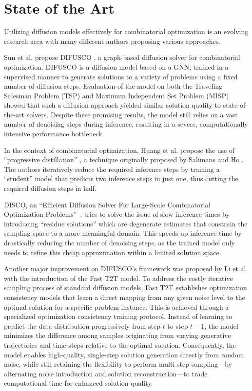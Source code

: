 \section{State of the Art}
Utilizing diffusion models effectively for combinatorial optimization is an
evolving research area with many different authors proposing various
approaches.

Sun et al. propose DIFUSCO \cite{sun-23-difusco}, a graph-based diffusion
solver for combinatorial optimization. DIFUSCO is a diffusion model based on a
GNN, trained in a supervised manner to generate solutions to a variety of
problems using a fixed number of diffusion steps. Evaluation of the model on
both the Traveling Salesman Problem (TSP) and Maximum Independent Set Problem
(MISP) showed that such a diffusion approach yielded similar solution quality
to state-of-the-art solvers. Despite these promising results, the model still
relies on a vast number of denoising steps during inference, resulting in a
severe, computationally intensive performance bottleneck.

In the context of combinatorial optimization, Huang et al. propose the use of
``progressive distillation'' \cite{huang-23-progressive-distillation-co}, a
technique originally proposed by Salimans and Ho
\cite{salimans-22-progressive-distillation-original}. The authors iteratively
reduce the required inference steps by training a ``student'' model that
predicts two inference steps in just one, thus cutting the required diffusion
steps in half.

DISCO, an ``Efficient Diffusion Solver For Large-Scale Combinatorial
Optimization Problems''~\cite{zhao-25-disco}, tries to solve the issue of slow
inference times by introducing ``residue solutions'' which are degenerate
estimates that constrain the sampling space to a more meaningful domain. This
speeds up inference time by drastically reducing the number of denoising steps,
as the trained model only needs to refine this cheap approximation within a
limited solution space.

Another major improvement on DIFUSCO's framework was proposed by Li et al. \cite{li-24-fastt2t} with the introduction of the Fast T2T model. To address the costly iterative sampling process of standard diffusion models, Fast T2T establishes optimization consistency models that learn a direct mapping from any given noise level to the optimal solution for a specific problem instance. This is achieved through a specialized optimization consistency training protocol. Instead of learning to predict the data distribution progressively from step $t$ to step $t-1$, the model minimizes the difference among samples originating from varying generative trajectories and time steps relative to the optimal solution. Consequently, the model enables high-quality, single-step solution generation directly from random noise, while still retaining the flexibility to perform multi-step sampling---by alternating noise introduction and solution reconstruction---to trade computational time for enhanced solution quality.

